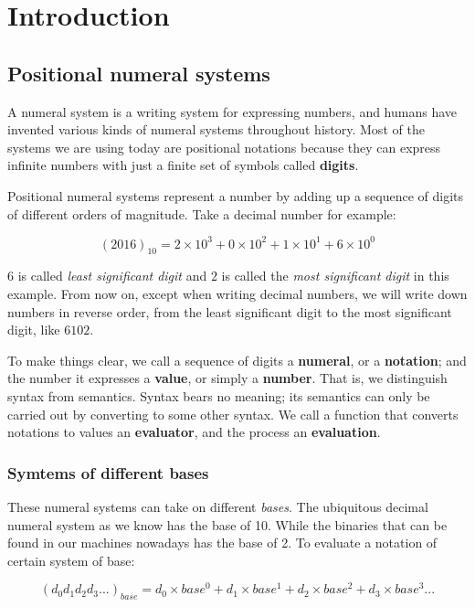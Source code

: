 \documentclass[../thesis.tex]{subfiles}
\begin{document}
\section{Introduction}\label{introduction}

\subsection{Positional numeral systems}

A numeral system is a writing system for expressing numbers, and humans have
invented various kinds of numeral systems throughout history. Most of the
systems we are using today are positional notations\cite{knuth1998art} because
they can express infinite numbers with just a finite set of symbols called
\textbf{digits}.

Positional numeral systems represent a number by adding up a sequence of digits
of different orders of magnitude. Take a decimal number for example:

$$ (2016)_{10} = 2\times10^3 + 0\times10^2 + 1\times10^1 + 6\times10^0 $$

$ 6 $ is called \textit{least significant digit} and $ 2 $ is called the
\textit{most significant digit} in this example. From now on, except when writing
decimal numbers, we will write down numbers in reverse order, from the least
significant digit to the most significant digit, like $ 6102 $.

To make things clear, we call a sequence of digits a \textbf{numeral}, or a \textbf{notation};
and the number it expresses a \textbf{value}, or simply a \textbf{number}. That is,
we distinguish syntax from semantics. Syntax bears no meaning; its semantics can
only be carried out by converting to some other syntax. We call a function that
converts notations to values an \textbf{evaluator}, and the process an
\textbf{evaluation}.

\subsubsection{Symtems of different bases}

These numeral systems can take on different \textit{bases}. The ubiquitous decimal
numeral system as we know has the base of 10. While the binaries that can be found
in our machines nowadays has the base of 2. To evaluate a notation of certain
system of base:

$$
    ({d_0d_1d_2d_3...})_{base}
    =
    d_0\times base^0 + d_1\times base^1 + d_2\times base^2 + d_3\times base^3 ...
$$
\end{document}
